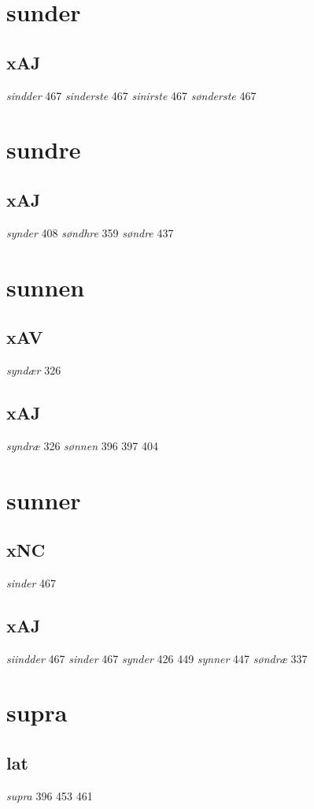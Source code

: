 \documentclass[a4paper,twocolumn]{article}
\begin{document}
\section{sunder}
\label{sec:org73e7731}
\subsection{xAJ}
\label{sec:orge24bce6}
\emph{sindder} 467 \emph{sinderste} 467 \emph{sinirste} 467 \emph{sønderste} 467 
\section{sundre}
\label{sec:orge91996d}
\subsection{xAJ}
\label{sec:orga5d3e10}
\emph{synder} 408 \emph{søndhre} 359 \emph{søndre} 437 
\section{sunnen}
\label{sec:org68409fc}
\subsection{xAV}
\label{sec:org75407d9}
\emph{syndær} 326 
\subsection{xAJ}
\label{sec:orga20a170}
\emph{syndræ} 326 \emph{sønnen} 396 397 404 
\section{sunner}
\label{sec:orgbb34d92}
\subsection{xNC}
\label{sec:org58b9af3}
\emph{sinder} 467 
\subsection{xAJ}
\label{sec:org724e7cd}
\emph{siindder} 467 \emph{sinder} 467 \emph{synder} 426 449 \emph{synner} 447 \emph{søndræ} 337 
\section{supra}
\label{sec:org74b1561}
\subsection{lat}
\label{sec:org1ed8282}
\emph{supra} 396 453 461 
\end{document}
